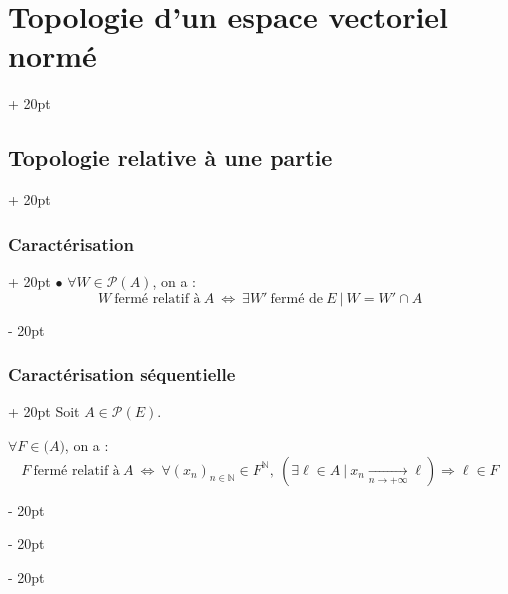 \documentclass[a4paper, 12pt, twoside]{article}
\newcommand{\N}{\mathbb{N}} %
\newcommand{\tendsto}[1]{\xrightarrow[#1]{}}
\newcommand{\ssi}{\ \Leftrightarrow \ }
\newcommand{\ind}[1][20pt]{\advance\leftskip + #1}
\newcommand{\deind}[1][20pt]{\advance\leftskip - #1}
\newenvironment{indt}[2][20pt]{#2 \par \ind[#1]}{\par \deind} %
\begin{document}
\begin{indt}{\section{Topologie d'un espace vectoriel normé}}
\begin{indt}{\subsection{Topologie relative à une partie}}
\begin{indt}{\subsubsection{Caractérisation}}
                $\bullet$ $\forall W \in \mathcal P(A)$, on a :
                \[
                    W\ \text{fermé relatif à}\ A
                    \ssi
                    \exists W'\ \text{fermé de}\ E\ |\ W = W' \cap A
                \]
            \end{indt}

            \vspace{12pt}
            
            \begin{indt}{\subsubsection{Caractérisation séquentielle}}
                Soit $A \in \mathcal P(E)$.

                $\forall F \in \mathcal (A)$, on a :
                \[
                    F\ \text{fermé relatif à}\ A
                    \ssi
                    \forall (x_n)_{n \in \N} \in F^\N,\
                    (\exists \ell \in A\ |\ x_n \tendsto{n \to +\infty} \ell) \Rightarrow \ell \in F
                \]
            \end{indt}
        \end{indt}
    \end{indt}
    
\end{document}
